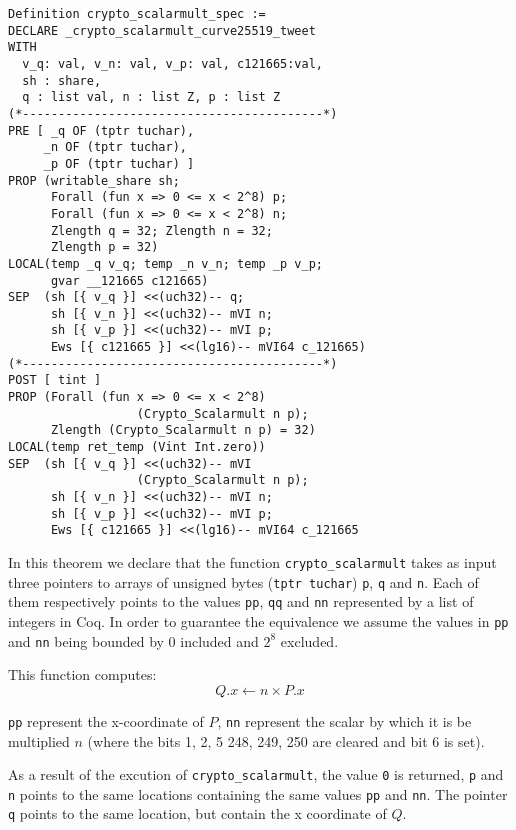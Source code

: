 \begin{lstlisting}[language=CoqVST]
Definition crypto_scalarmult_spec :=
DECLARE _crypto_scalarmult_curve25519_tweet
WITH
  v_q: val, v_n: val, v_p: val, c121665:val,
  sh : share,
  q : list val, n : list Z, p : list Z
(*------------------------------------------*)
PRE [ _q OF (tptr tuchar),
     _n OF (tptr tuchar),
     _p OF (tptr tuchar) ]
PROP (writable_share sh;
      Forall (fun x => 0 <= x < 2^8) p;
      Forall (fun x => 0 <= x < 2^8) n;
      Zlength q = 32; Zlength n = 32;
      Zlength p = 32)
LOCAL(temp _q v_q; temp _n v_n; temp _p v_p;
      gvar __121665 c121665)
SEP  (sh [{ v_q }] <<(uch32)-- q;
      sh [{ v_n }] <<(uch32)-- mVI n;
      sh [{ v_p }] <<(uch32)-- mVI p;
      Ews [{ c121665 }] <<(lg16)-- mVI64 c_121665)
(*------------------------------------------*)
POST [ tint ]
PROP (Forall (fun x => 0 <= x < 2^8)
                  (Crypto_Scalarmult n p);
      Zlength (Crypto_Scalarmult n p) = 32)
LOCAL(temp ret_temp (Vint Int.zero))
SEP  (sh [{ v_q }] <<(uch32)-- mVI
                  (Crypto_Scalarmult n p);
      sh [{ v_n }] <<(uch32)-- mVI n;
      sh [{ v_p }] <<(uch32)-- mVI p;
      Ews [{ c121665 }] <<(lg16)-- mVI64 c_121665
\end{lstlisting}

In this theorem we declare that the function \texttt{crypto\_scalarmult} takes as
input three pointers to arrays of unsigned bytes (\texttt{tptr tuchar}) \texttt{p},
\texttt{q} and \texttt{n}.
Each of them respectively points to the values \texttt{pp},  \texttt{qq} and  \texttt{nn}
represented by a list of integers in Coq. In order to guarantee the equivalence
we assume the values in \texttt{pp} and \texttt{nn} being bounded by $0$ included
and $2^8$ excluded.

This function computes: $$Q.x \leftarrow n \times P.x$$

\texttt{pp} represent the x-coordinate of $P$, \texttt{nn} represent the
scalar by which it is be multiplied $n$ (where the bits 1, 2, 5 248, 249, 250
are cleared and bit 6 is set).

As a result of the excution of \texttt{crypto\_scalarmult}, the value \texttt{0}
is returned, \texttt{p} and \texttt{n} points to the same locations containing
the same values \texttt{pp} and \texttt{nn}.
The pointer \texttt{q} points to the same location, but contain the x coordinate of $Q$.
